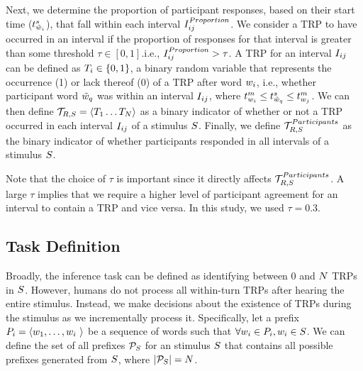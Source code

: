 Next, we determine the proportion of participant responses, based on their start time ($t_{\tilde{w}_{i}}^s$), that fall within each interval $I_{ij}^{Proportion}$. We consider a TRP to have occurred in an interval if the proportion of responses for that interval is greater than some threshold $\tau \in [0,1]$.i.e., $I_{ij}^{Proportion} > \tau$. A TRP for an interval $I_{ij}$ can be defined as $T_{i} \in \{0,1\}$, a binary random variable that represents the occurrence (1) or lack thereof (0) of a TRP after word $w_{i}$, i.e., whether participant word $\tilde{w}_{q}$ was within an interval $I_{ij}$, where $t_{w_{i}}^m \leq t_{\tilde{w}_{q}}^s \leq t_{w_{j}}^m$. We can then
define $\mathcal{T}_{R, S} = \langle T_{1} \ldots T_{N} \rangle$ as a binary indicator of whether or not a TRP occurred in each interval $I_{ij}$ of a stimulus $S$. Finally, we define $\mathcal{T}_{R, S}^{Participants}$ as the binary indicator of whether participants responded in all intervals of a stimulus $S$.

Note that the choice of $\tau$ is important since it directly affects $\mathcal{T}_{R, S}^{Participants}$. A large $\tau$ implies that we require a higher level of participant agreement for an interval to contain a TRP and vice versa. In this study, we used $\tau = 0.3$.



\subsection*{Task Definition}

Broadly, the inference task can be defined as identifying between 0 and $N$ TRPs in $S$. However, humans do not process all within-turn TRPs after hearing the entire stimulus. Instead, we make decisions about the existence of TRPs during the stimulus as we incrementally process it. Specifically, let a prefix $\prefix{i} = \langle \word{1},\ldots, w_i\ \rangle$ be a sequence of words such that $\forall w_{i} \in P_{i}, w_{i} \in S$. We can define the set of all prefixes $\mathcal{P}_S$ for an stimulus $S$ that contains all possible prefixes generated from $S$, where $|\mathcal{P}_S| = N$.

\newtheorem{definition}{Definition}[section]


